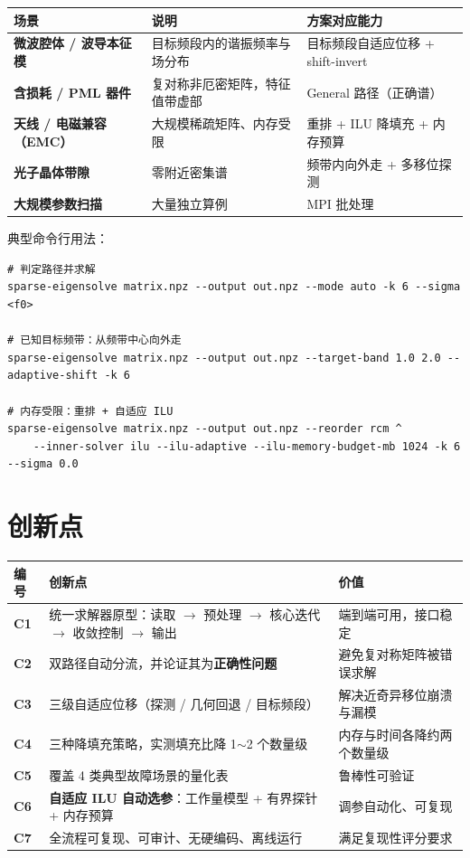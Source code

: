 \documentclass[11pt,a4paper]{ctexart}
\begin{document}
\begin{table}[h]
\centering\small
\renewcommand{\arraystretch}{1.3}
\begin{tabularx}{\textwidth}{@{}>{\bfseries}p{4.0cm} X p{4.6cm}@{}}
\toprule
场景 & 说明 & 方案对应能力 \\
\midrule
微波腔体 / 波导本征模 & 目标频段内的谐振频率与场分布 & 目标频段自适应位移 + shift-invert \\
含损耗 / PML 器件 & 复对称非厄密矩阵，特征值带虚部 & General 路径（正确谱） \\
天线 / 电磁兼容（EMC） & 大规模稀疏矩阵、内存受限 & 重排 + ILU 降填充 + 内存预算 \\
光子晶体带隙 & 零附近密集谱 & 频带内向外走 + 多移位探测 \\
大规模参数扫描 & 大量独立算例 & MPI 批处理 \\
\bottomrule
\end{tabularx}
\end{table}

典型命令行用法：

\begin{lstlisting}
# 判定路径并求解
sparse-eigensolve matrix.npz --output out.npz --mode auto -k 6 --sigma <f0>

# 已知目标频带：从频带中心向外走
sparse-eigensolve matrix.npz --output out.npz --target-band 1.0 2.0 --adaptive-shift -k 6

# 内存受限：重排 + 自适应 ILU
sparse-eigensolve matrix.npz --output out.npz --reorder rcm ^
    --inner-solver ilu --ilu-adaptive --ilu-memory-budget-mb 1024 -k 6 --sigma 0.0
\end{lstlisting}

\section{创新点}

\begin{table}[h]
\centering\small
\renewcommand{\arraystretch}{1.3}
\begin{tabularx}{\textwidth}{@{}>{\bfseries}p{1.1cm} X p{5.2cm}@{}}
\toprule
编号 & 创新点 & 价值 \\
\midrule
C1 & 统一求解器原型：读取 $\to$ 预处理 $\to$ 核心迭代 $\to$ 收敛控制 $\to$ 输出 & 端到端可用，接口稳定 \\
C2 & 双路径自动分流，并论证其为\textbf{正确性问题} & 避免复对称矩阵被错误求解 \\
C3 & 三级自适应位移（探测 / 几何回退 / 目标频段） & 解决近奇异移位崩溃与漏模 \\
C4 & 三种降填充策略，实测填充比降 1$\sim$2 个数量级 & 内存与时间各降约两个数量级 \\
C5 & 覆盖 4 类典型故障场景的量化表 & 鲁棒性可验证 \\
C6 & \textbf{自适应 ILU 自动选参}：工作量模型 + 有界探针 + 内存预算 & 调参自动化、可复现 \\
C7 & 全流程可复现、可审计、无硬编码、离线运行 & 满足复现性评分要求 \\
\bottomrule
\end{tabularx}
\end{table}
\end{document}
